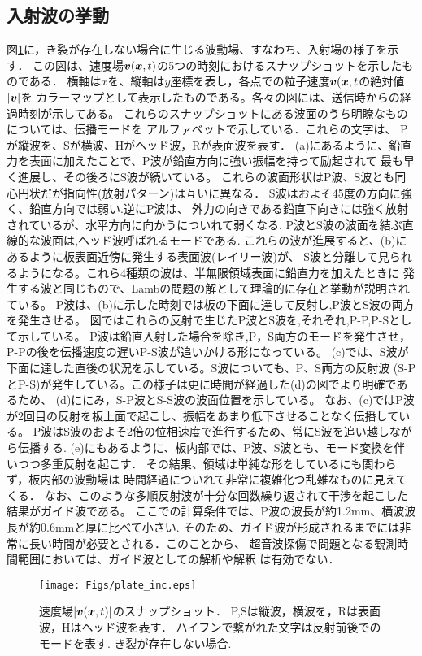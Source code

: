 \subsection{入射波の挙動}
図\ref{fig:fig3_1}に，き裂が存在しない場合に生じる波動場、すなわち、入射場の様子を示す．
この図は、速度場$\mbox{\boldmath $v$}(\mbox{\boldmath $x$},t)$の5つの時刻におけるスナップショットを示したものである．
横軸は$x$を、縦軸は$y$座標を表し，各点での粒子速度$\mbox{\boldmath $v$}(\mbox{\boldmath $x$},t$の絶対値$|\mbox{\boldmath $v$}|$を
カラーマップとして表示したものである。各々の図には、送信時からの経過時刻が示してある。
これらのスナップショットにある波面のうち明瞭なものについては、伝播モードを
アルファベットで示している．これらの文字は、
Pが縦波を、Sが横波、Hがヘッド波，Rが表面波を表す．
(a)にあるように、鉛直力を表面に加えたことで、P波が鉛直方向に強い振幅を持って励起されて
最も早く進展し、その後ろにS波が続いている。
これらの波面形状はP波、S波とも同心円状だが指向性(放射パターン)は互いに異なる．
S波はおよそ45度の方向に強く、鉛直方向では弱い.逆にP波は、
外力の向きである鉛直下向きには強く放射されているが、水平方向に向かうについれて弱くなる.
P波とS波の波面を結ぶ直線的な波面は,ヘッド波呼ばれるモードである.
これらの波が進展すると、(b)にあるように板表面近傍に発生する表面波(レイリー波)が、
S波と分離して見られるようになる。これら4種類の波は、半無限領域表面に鉛直力を加えたときに
発生する波と同じもので、Lambの問題の解として理論的に存在と挙動が説明されている。
P波は、(b)に示した時刻では板の下面に達して反射し,P波とS波の両方を発生させる。
図ではこれらの反射で生じたP波とS波を,それぞれ,P-P,P-Sとして示している。
P波は鉛直入射した場合を除き,P，S両方のモードを発生させ，
P-Pの後を伝播速度の遅いP-S波が追いかける形になっている。
(c)では、S波が下面に達した直後の状況を示している。S波についても、P、S両方の反射波
(S-PとP-S)が発生している。この様子は更に時間が経過した(d)の図でより明確であるため、
(d)ににみ，S-P波とS-S波の波面位置を示している。
なお、(c)ではP波が2回目の反射を板上面で起こし、振幅をあまり低下させることなく伝播している。
P波はS波のおよそ2倍の位相速度で進行するため、常にS波を追い越しながら伝播する.
(e)にもあるように、板内部では、P波、S波とも、モード変換を伴いつつ多重反射を起こす．
その結果、領域は単純な形をしているにも関わらず，板内部の波動場は
時間経過についれて非常に複雑化つ乱雑なものに見えてくる．
なお、このような多順反射波が十分な回数繰り返されて干渉を起こした結果がガイド波である。
ここでの計算条件では、P波の波長が約1.2mm、横波波長が約0.6mmと厚に比べて小さい.
そのため、ガイド波が形成されるまでには非常に長い時間が必要とされる．このことから、
超音波探傷で問題となる観測時間範囲においては、ガイド波としての解析や解釈
は有効でない．
\begin{figure}[h]
	\begin{center}
	\texttt{[image: Figs/plate\_inc.eps]} 
	\end{center}
	\caption{
		速度場$|\mbox{\boldmath $v$}(\mbox{\boldmath $x$},t)|$のスナップショット．
		P,Sは縦波，横波を，Rは表面波，Hはヘッド波を表す．
		ハイフンで繋がれた文字は反射前後でのモードを表す. き裂が存在しない場合.
	} 
	\label{fig:fig3_1}
\end{figure}
